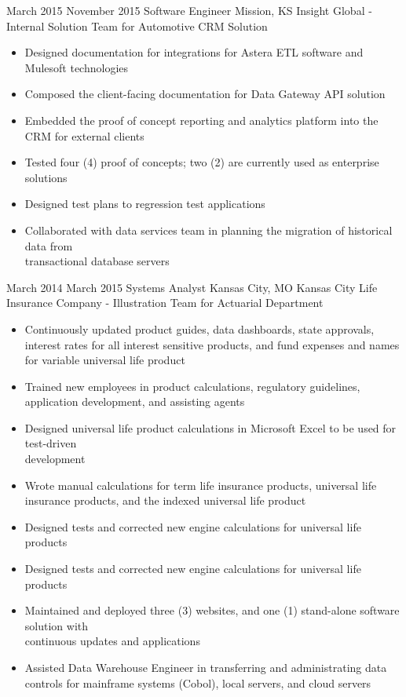 
\Experience
{March 2015}
{November 2015}
{Software Engineer}
{Mission, KS}
{Insight Global - Internal Solution Team for Automotive CRM Solution}
{\begin{itemize}
     \item Designed documentation for integrations for Astera ETL software and Mulesoft
     technologies
     \item Composed the client-facing documentation for Data Gateway API solution
     \item Embedded the proof of concept reporting and analytics platform into the CRM for
     external clients
     \item Tested four (4) proof of concepts; two (2) are currently used as enterprise solutions
     \item Designed test plans to regression test applications
     \item Collaborated with data services team in planning the migration of historical data from
     \\transactional database servers
\end{itemize}}

\vspace*{0.05 in}

\Experience
{March 2014}
{March 2015}
{Systems Analyst}
{Kansas City, MO}
{Kansas City Life Insurance Company - Illustration Team for Actuarial Department}
{\begin{itemize}
    \item Continuously updated product guides, data dashboards, state approvals, interest rates
    for all interest sensitive products, and fund expenses and names for variable universal
    life product
    \item Trained new employees in product calculations, regulatory guidelines, application
    development, and assisting agents
    \item Designed universal life product calculations in Microsoft Excel to be used for
    test-driven \\development
    \item Wrote manual calculations for term life insurance products, universal life insurance
    products, and the indexed universal life product
    \item Designed tests and corrected new engine calculations for universal life products
    \item Designed tests and corrected new engine calculations for universal life products
    \item Maintained and deployed three (3) websites, and one (1) stand-alone software solution
    with \\continuous updates and applications
    \item Assisted Data Warehouse Engineer in transferring and administrating data controls for
    mainframe systems (Cobol), local servers, and cloud servers
\end{itemize}}
